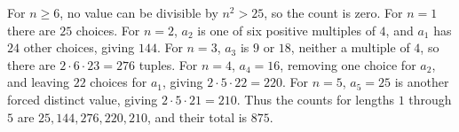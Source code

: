 For $n\ge6$, no value can be divisible by $n^2>25$, so the count is zero. For $n=1$ there are $25$ choices. For $n=2$, $a_2$ is one of six positive multiples of $4$, and $a_1$ has $24$ other choices, giving $144$. For $n=3$, $a_3$ is $9$ or $18$, neither a multiple of $4$, so there are $2\cdot6\cdot23=276$ tuples. For $n=4$, $a_4=16$, removing one choice for $a_2$, and leaving $22$ choices for $a_1$, giving $2\cdot5\cdot22=220$. For $n=5$, $a_5=25$ is another forced distinct value, giving $2\cdot5\cdot21=210$. Thus the counts for lengths $1$ through $5$ are $\boxed{25,144,276,220,210}$, and their total is $\boxed{875}$.
